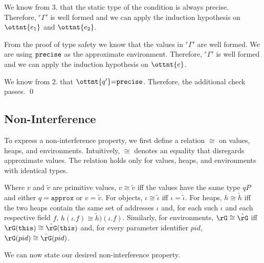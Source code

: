 
We know from $3.$ that the static type of the condition is always
precise.
Therefore, $\mathit{ {^r}\!\Gamma}'$ is well formed and we can apply the induction
hypothesis on $\ottnt{e_{{\mathrm{1}}}}$ and $\ottnt{e_{{\mathrm{2}}}}$.



From the proof of type safety we know that the values in $\mathit{ {^r}\!\Gamma}'$ are
well formed. We are using $ \texttt{\upshape{precise}\,\!} $ as the approximate environment.
Therefore, $\mathit{ {^r}\!\Gamma}'$ is well formed and we can apply the induction
hypothesis on $\ottnt{e}$.



We know from $2.$ that $\ottnt{q'}  \textsf{=}   \texttt{\upshape{precise}\,\!} $.
Therefore, the additional check passes.
\qed


\subsection{Non-Interference}

To express a non-interference property, we first define a relation $\cong$ on
values, heaps, and environments. Intuitively, 
$\cong$ denotes an equality that disregards approximate
values. The relation holds only for values, heaps, and environments with
identical types.

Where $v$ and $\tilde{v}$ are primitive values, $v \cong \tilde{v}$ iff the
values have the same type $qP$ and either $q = \mathtt{approx}$ or $v =
\tilde{v}$. For objects, $\iota \cong \tilde{\iota}$ iff $\iota =
\tilde{\iota}$.
For heaps, $h \cong \tilde{h}$ iff the two heaps contain the same set of
addresses $\iota$ and, for each such $\iota$ and each respective field
$f$, $h(\iota.f) \cong \tilde{h})(\iota.f)$. Similarly, for environments,
$\rG \cong \tilde{\rG}$ iff
$\rG(\texttt{this}) \cong \tilde{\rG}(\texttt{this})$ and, for every parameter
identifier $pid$, $\rG(pid) \cong \tilde{\rG}(pid)$.

We can now state our desired non-interference property.

